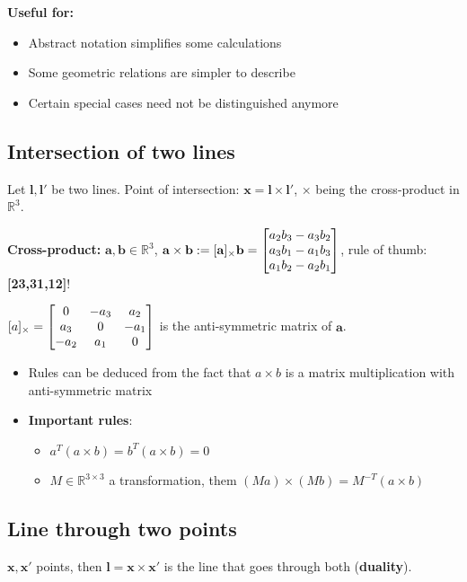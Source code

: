 \textbf{Useful for:} \begin{itemize}
    \item Abstract notation simplifies some calculations
    \item Some geometric relations are simpler to describe
    \item Certain special cases need not be distinguished anymore
\end{itemize}

\subsection{Intersection of two lines}

Let $\mathbf{l, l'}$ be two lines. Point of intersection: $\mathbf{x = l \times l'}$, $\times$ being the cross-product in $\mathbb{R}^3$.

\textbf{Cross-product:} $\mathbf{a,b} \in \mathbb{R}^3$, $\mathbf{a \times b} := [\mathbf{a}]_\times \mathbf{b} = \left[\begin{matrix}a_2b_3-a_3b_2 \\ a_3b_1 - a_1b_3 \\ a_1b_2 - a_2 b_1\end{matrix}\right]$, rule of thumb: \textbf{[23,31,12]}!

$[a]_\times = \left[\begin{matrix}0 & -a_3 & a_2 \\ a_3 & 0 & -a_1 \\ -a_2 & a_1 & 0\end{matrix}\right]$ is the anti-symmetric matrix of $\mathbf{a}$.

\begin{itemize}
    \item Rules can be deduced from the fact that $a \times b$ is a matrix multiplication with anti-symmetric matrix
    \item \textbf{Important rules}: {\begin{itemize}
        \item $a^T(a\times b) = b^T(a \times b) = 0$
        \item $M \in \mathbb{R}^{3\times 3}$ a transformation, them $(Ma) \times (Mb) = M^{-T} (a\times b)$
    \end{itemize}}
\end{itemize}

\subsection{Line through two points}

$\mathbf{x, x'}$ points, then $\mathbf{l = x \times x'}$ is the line that goes through both (\textbf{duality}).

